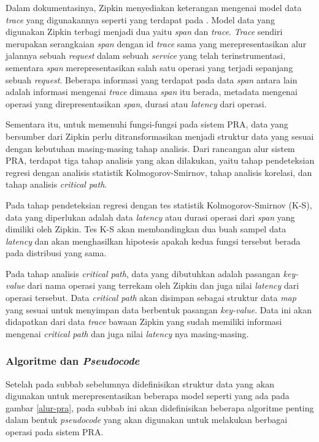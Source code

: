 Dalam dokumentasinya, Zipkin menyediakan keterangan mengenai model data \textit{trace} yang digunakannya seperti yang terdapat pada \citep{zipkin-data}. Model data yang digunakan Zipkin terbagi menjadi dua yaitu \textit{span} dan \textit{trace}. \textit{Trace} sendiri merupakan serangkaian \textit{span} dengan id \textit{trace} sama yang merepresentasikan alur jalannya sebuah \textit{request} dalam sebuah \textit{service} yang telah terinstrumentasi, sementara \textit{span} merepresentasikan salah satu operasi yang terjadi sepanjang sebuah \textit{request}. Beberapa informasi yang terdapat pada data \textit{span} antara lain adalah informasi mengenai \textit{trace} dimana \textit{span} itu berada, metadata mengenai operasi yang direpresentasikan \textit{span}, durasi atau \textit{latency} dari operasi.

Sementara itu, untuk memenuhi fungsi-fungsi pada sistem PRA, data yang bersumber dari Zipkin perlu ditransformasikan menjadi struktur data yang sesuai dengan kebutuhan masing-masing tahap analisis. Dari rancangan alur sistem PRA, terdapat tiga tahap analisis yang akan dilakukan, yaitu tahap pendeteksian regresi dengan analisis statistik Kolmogorov-Smirnov, tahap analisis korelasi, dan tahap analisis \textit{critical path}.

Pada tahap pendeteksian regresi dengan tes statistik Kolmogorov-Smirnov (K-S), data yang diperlukan adalah data \textit{latency} atau durasi operasi dari \textit{span} yang dimiliki oleh Zipkin. Tes K-S akan membandingkan dua buah sampel data \textit{latency} dan akan menghasilkan hipotesis apakah kedua fungsi tersebut berada pada distribusi yang sama.

Pada tahap analisis \textit{critical path}, data yang dibutuhkan adalah pasangan \textit{key-value} dari nama operasi yang terrekam oleh Zipkin dan juga nilai \textit{latency} dari operasi tersebut. Data \textit{critical path} akan disimpan sebagai struktur data \textit{map} yang sesuai untuk menyimpan data berbentuk pasangan \textit{key-value}. Data ini akan didapatkan dari data \textit{trace} bawaan Zipkin yang sudah memiliki informasi mengenai \textit{critical path} dan juga nilai \textit{latency} nya masing-masing. 

\subsubsection{Algoritme dan \textit{Pseudocode}}
Setelah pada subbab sebelumnya didefinisikan struktur data yang akan digunakan untuk merepresentasikan beberapa model seperti yang ada pada gambar \ref{alur-pra}, pada subbab ini akan didefinisikan beberapa algoritme penting dalam bentuk \textit{pseudocode} yang akan digunakan untuk melakukan berbagai operasi pada sistem PRA.

